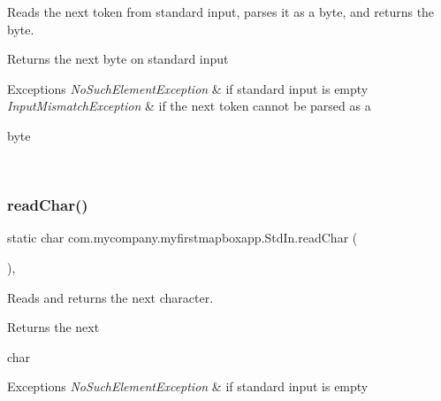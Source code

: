 Reads the next token from standard input, parses it as a byte, and returns the byte.

\begin{DoxyReturn}{Returns}
the next byte on standard input 
\end{DoxyReturn}

\begin{DoxyExceptions}{Exceptions}
{\em No\+Such\+Element\+Exception} & if standard input is empty \\
\hline
{\em Input\+Mismatch\+Exception} & if the next token cannot be parsed as a
\begin{DoxyCode}
byte 
\end{DoxyCode}
 \\
\hline
\end{DoxyExceptions}
\mbox{\label{classcom_1_1mycompany_1_1myfirstmapboxapp_1_1_std_in_ab6468a980b4dba835a5168734d16ef31}} 
\subsubsection{\texorpdfstring{read\+Char()}{readChar()}}
{\footnotesize\ttfamily static char com.\+mycompany.\+myfirstmapboxapp.\+Std\+In.\+read\+Char (\begin{DoxyParamCaption}{ }\end{DoxyParamCaption})\hspace{0.3cm}{\ttfamily [inline]}, {\ttfamily [static]}}

Reads and returns the next character.

\begin{DoxyReturn}{Returns}
the next
\begin{DoxyCode}
\textcolor{keywordtype}{char} 
\end{DoxyCode}
 
\end{DoxyReturn}

\begin{DoxyExceptions}{Exceptions}
{\em No\+Such\+Element\+Exception} & if standard input is empty \\
\hline
\end{DoxyExceptions}
\mbox{\label{classcom_1_1mycompany_1_1myfirstmapboxapp_1_1_std_in_a4eeca1a8d8f9ab168bbe9ddf87d9f3e5}} 
